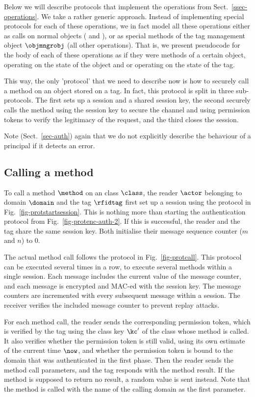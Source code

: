 Below we will describe protocols that implement the operations
from Sect.~\ref{ssec-operations}. We take a rather generic approach. Instead of
implementing special protocols for each of these operations, we
in fact model all these operations
either as calls on normal objects ( and
), or as  
special methods of the tag management object $\objmngrobj$ (all other
operations).
That is, we present pseudocode for the body of each of these operations as if
they were methods of a certain object, operating on the state of the object and
or operating on the state of the tag. 

This way, the only 'protocol' that we need to
describe now is how to securely call a method on an object stored on a tag. In
fact, this protocol is split in three sub-protocols. The first sets up a
session and a shared session key, the second securely calls the method using
the session key to secure the channel and using permission tokens to verify the
legitimacy of the request, and the third closes the session.

Note (\cf Sect.~\ref{sec-auth}) again that we do not explicitly describe the
behaviour of a principal if it detects an error.

\subsection{Calling a method}
\label{ssec-callingamethod}

To call a method $\method$ on an class $\class$, the reader $\actor$
belonging to
domain $\domain$ and the tag $\rfidtag$ first set up a session using
the protocol in
Fig.~\ref{fig-protstartsession}. 
This is nothing more than starting the
authentication protocol from Fig.~\ref{fig-protenc-auth-2}.
If this is successful, the reader and the tag share the same session key. 
Both initialise their message sequence counter ($m$ and $n$) to $0$. 

The actual method call follows the protocol in Fig.~\ref{fig-protcall}. This
protocol can be executed several times in a row, to execute several methods
within a single session.
Each message includes the current value of the message counter, and each
message is encrypted and MAC-ed with the session key. 
The message counters are incremented with every subsequent message within a session.
The receiver verifies the
included message counter to prevent replay attacks.

For each method call, the reader sends the corresponding permission token, which is
verified by the tag using the class key $\kc'$ of the class whose method is
called. It also verifies whether the permission token is still valid, using its own
estimate of the current time $\now$, and whether the permission token is bound to the
domain that was authenticated in the first phase.
Then the reader sends the method call
parameters, and the tag responds with the method result. If the method is
supposed to return no result, a random value is sent instead.
Note that the method is called with the name of the calling domain as the first
parameter.

